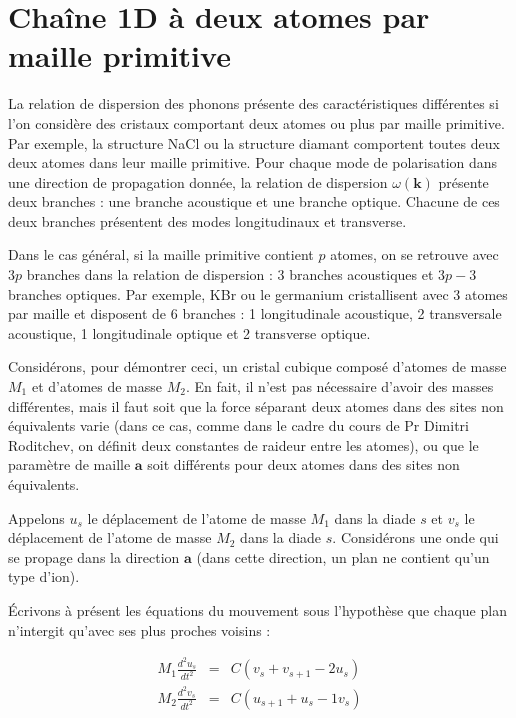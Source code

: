 \section{Chaîne 1D à deux atomes par maille primitive}

La relation de dispersion des phonons présente des caractéristiques différentes 
si l'on considère des cristaux comportant deux atomes ou plus par maille
primitive. Par exemple, la structure NaCl ou la structure diamant comportent
toutes deux deux atomes dans leur maille primitive. Pour chaque mode de
polarisation dans une direction de propagation donnée, la relation de
dispersion $\omega(\mathbf{k})$ présente deux branches : une branche acoustique
et une branche optique. Chacune de ces deux branches présentent des
modes longitudinaux et transverse.

Dans le cas général, si la maille primitive contient $p$ atomes, on se
retrouve avec $3p$ branches dans la relation de dispersion : 3 branches
acoustiques et $3p-3$ branches optiques. Par exemple, KBr ou le germanium
cristallisent avec 3 atomes par maille et disposent de 6 branches :
1 longitudinale acoustique, 2 transversale acoustique, 1 longitudinale optique
et 2 transverse optique.

Considérons, pour démontrer ceci, un cristal cubique composé d'atomes de masse
$M_1$ et d'atomes de masse $M_2$. En fait, il n'est pas nécessaire d'avoir des
masses différentes, mais il faut soit que la force séparant deux atomes dans des
sites non équivalents varie (dans ce cas, comme dans le cadre du cours de 
Pr Dimitri Roditchev, on définit deux constantes de raideur entre les atomes),
ou que le paramètre de maille $\mathbf{a}$ soit différents pour deux atomes dans
des sites non équivalents.

Appelons $u_s$ le déplacement de l'atome de masse $M_1$ dans la diade $s$ et
$v_s$ le déplacement de l'atome de masse $M_2$ dans la diade $s$. Considérons
une onde qui se propage dans la direction $\mathbf{a}$ (dans cette direction, un
plan ne contient qu'un type d'ion).

Écrivons à présent les équations du mouvement sous l'hypothèse que chaque plan
n'intergit qu'avec ses plus proches voisins :

\begin{eqnarray}
M_1 \frac{d^2u_s}{dt^2} & = & C (v_s + v_{s+1} - 2u_s)\\
M_2 \frac{d^2v_s}{dt^2} & = & C (u_{s+1} + u_s - 1v_s)
\label{eq:mvtdeuxatomes}
\end{eqnarray}

